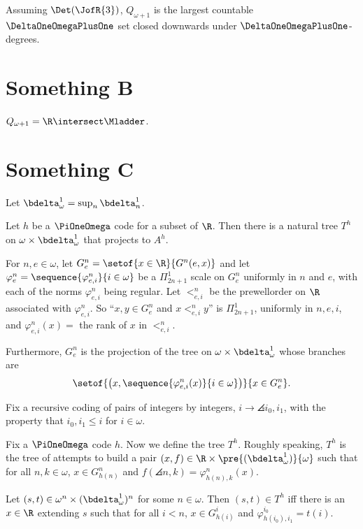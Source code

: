 \documentclass[oneside,12pt]{amsart}
\begin{document}
\begin{remark}
Assuming $\Det(\JofR{3})$, $Q_{\omega+1}$ is the largest countable
$\DeltaOneOmegaPlusOne$ set closed downwards under
$\DeltaOneOmegaPlusOne$-degrees.
\end{remark}

\section{Something B}
\label{section:somethingb}
\begin{theorem}
$Q_{\omega+1} = \R \intersect \Mladder$.
\end{theorem}

\section{Something C}
\label{section:somethingac}

Let $\bdelta^1_{\omega} = \sup_n \bdelta^1_n$.

\begin{definition}
Let $h$ be a $\PiOneOmega$ code for a subset of $\R$.
Then there is a natural tree $T^{h}$ on $\omega\times\bdelta^1_{\omega}$ that projects to $A^h$.

For $n,e\in\omega$, let $G^n_e = \setof{x\in\R}{G^n(e, x)}$ and
let $\varphi^n_e = \sequence{\varphi^n_{e,i}}{i\in\omega}$ be a $\Pi^1_{2n+1}$ scale on $G^n_e$ uniformly in $n$ and $e$,
with each of the norms $\varphi^n_{e,i}$ being regular.
Let $<^n_{e,i}$ be the prewellorder on $\R$ associated with $\varphi^n_{e,i}$. So ``$x,y\in G^n_e$ and $x <^n_{e,i} y$'' is
$\Pi^1_{2n+1}$, uniformly in $n,e,i$, and $\varphi^n_{e,i}(x) = $ the rank of $x$ in $<^n_{e,i}$.

Furthermore, $G^n_e$ is the projection of the tree on $\omega \times \bdelta^1_{\omega}$ whose branches are
$$\setof{\left(x,\sequence{\varphi^n_{e,i}(x)}{i\in\omega}\right)}{x\in G^n_e}.$$

Fix a recursive coding of pairs of integers by integers, $i\to\angles{i_0,i_1}$,
with the property that $i_0,i_1\leq i$ for $i\in\omega$.

Fix a $\PiOneOmega$ code $h$. Now we define the tree $T^h$. Roughly speaking, $T^h$ is the tree of attempts to
build a pair $(x,f) \in \R \times \pre{(\bdelta^1_{\omega})}{\omega}$ such that for all $n,k\in\omega$, $x\in G^n_{h(n)}$
and $f(\angles{n,k}) = \varphi^n_{h(n),k}(x)$.


Let $(s,t) \in \omega^n\times(\bdelta^1_{\omega})^n$ for some $n\in\omega$. Then $(s,t)\in T^h$ iff there is an
$x\in\R$ extending $s$ such that for all $i<n$, $x\in G^i_{h(i)}$ and $\varphi^{i_0}_{h(i_0),i_1} = t(i)$.
\end{definition}
\end{document}

